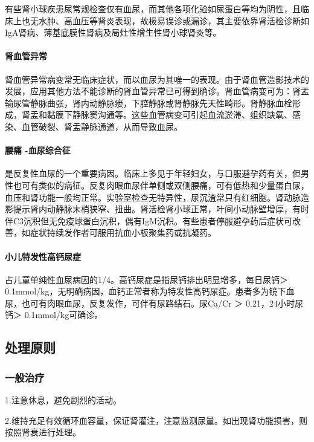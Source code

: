 有些肾小球疾患尿常规检查仅有血尿，而其他各项化验如尿蛋白等均为阴性，且临床上也无水肿、高血压等肾炎表现，故极易误诊或漏诊，其主要依靠肾活检诊断如IgA肾病、薄基底膜性肾病及局灶性增生性肾小球肾炎等。

\paragraph{肾血管异常}

肾血管异常病变常无临床症状，而以血尿为其唯一的表现。由于肾血管造影技术的发展，应用其他方法不能诊断的肾血管异常已可得到确诊。肾血管病变可为：肾盂输尿管静脉曲张，肾内动静脉瘘，下腔静脉或肾静脉先天性畸形。肾静脉血栓形成，肾盂和黏膜下静脉窦沟通等。这些血管病变可引起血流淤滞、组织缺氧、感染、血管破裂、肾盂静脉通道，从而导致血尿。

\paragraph{腰痛 -血尿综合征}

是反复性血尿的一个重要病因。临床上多见于年轻妇女，与口服避孕药有关，但男性也可有类似的病征。反复肉眼血尿伴单侧或双侧腰痛，可有低热和少量蛋白尿，血压和肾功能一般均正常。实验室检查无特异性，尿沉渣常只有红细胞。肾动脉造影提示肾内动静脉末梢狭窄、扭曲。肾活检肾小球正常，叶间小动脉壁增厚，有时伴C3沉积但无免疫球蛋白沉积，偶有IgM沉积。有些患者停服避孕药后症状可改善，如症状持续发作者可服用抗血小板聚集药或抗凝药。

\paragraph{小儿特发性高钙尿症}

占儿童单纯性血尿病因的1/4。高钙尿症是指尿钙排出明显增多，每日尿钙＞
0.1mmol/kg，无明确病因，血钙正常者称为特发性高钙尿症。患者多为镜下血尿，也可有肉眼血尿，反复发作，可伴有尿路结石。尿Ca/Cr
＞ 0.21，24小时尿钙＞ 0.1mmol/kg可确诊。

\subsection{处理原则}

\subsubsection{一般治疗}

1.注意休息，避免剧烈的活动。

2.维持充足有效循环血容量，保证肾灌注，注意监测尿量。如出现肾功能损害，则按照肾衰进行处理。

